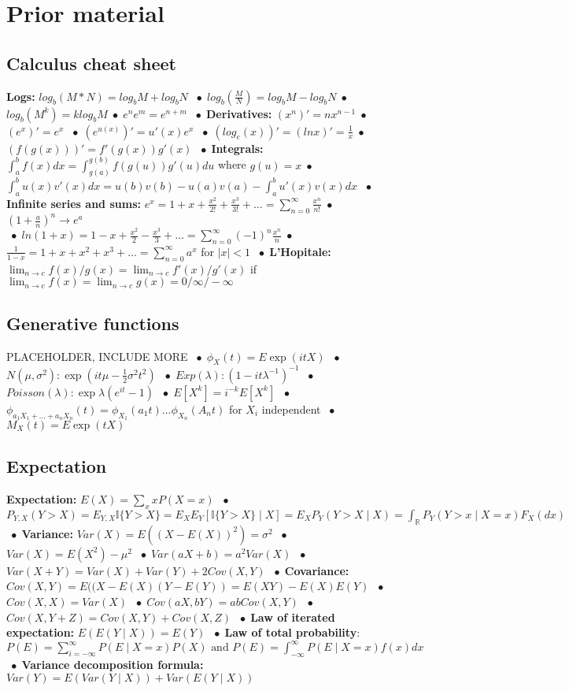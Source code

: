 \documentclass[9pt]{extarticle}
\newcommand{\abs}[1]{\lvert#1\rvert}
\newcommand*\bspace{$\; \bullet \;$}
\begin{document}
\section{Prior material}
\subsection{Calculus cheat sheet}
\textbf{Logs:} $log_b(M * N) = log_bM + log_bN$ \bspace $log_b(\frac{M}{N}) = log_bM - log_bN$\bspace $log_b(M^k) = klog_bM$\bspace $e^ne^m = e^{n+m}$ \bspace \textbf{Derivatives:} $(x^n)' = nx^{n-1}$\bspace $(e^x)' = e^x$ \bspace $(e^{u(x)})' = u'(x)e^x$ \bspace $(log_e(x))' = (lnx)' = \frac{1}{x}$\bspace $(f(g(x)))' = f'(g(x))g'(x)$ \bspace \textbf{Integrals: } $\int_a^b f(x)dx = \int_{g(a)}^{g(b)}f(g(u))g'(u)du$ where $g(u) = x$\bspace $\int_a^b u(x)v'(x)dx = u(b)v(b) - u(a)v(a) - \int_a^b u'(x)v(x)dx$ \bspace \textbf{Infinite series and sums:} $e^x = 1 + x + \frac{x^2}{2!} + \frac{x^3}{3!} + \dots = \sum_{n=0}^\infty \frac{x^n}{n!}$\bspace $(1 + \frac{a}{n})^n \longrightarrow e^a$\\
\bspace $ln(1 + x) = 1 - x + \frac{x^2}{2} - \frac{x^3}{3} + \dots = \sum_{n=0}^\infty (-1)^n\frac{x^n}{n}$\bspace $\frac{1}{1-x} = 1 + x + x^2 + x^3 + \dots = \sum_{n=0}^\infty a^x$ for $\abs{x} < 1$ \bspace \textbf{L'Hopitale:} $\lim_{n\rightarrow c} f(x) / g(x) = \lim_{n\rightarrow c} f'(x)/g'(x)$ if $\lim_{n\rightarrow c} f(x) = \lim_{n\rightarrow c} g(x) = 0/\infty/-\infty$
\subsection{Generative functions}
PLACEHOLDER, INCLUDE MORE
\bspace $\phi_X(t) = E \exp(itX)$ \bspace $N(\mu, \sigma^2): \exp(it\mu - \frac{1}{2}\sigma^2t^2)$ \bspace $Exp(\lambda): (1 - it\lambda ^{-1})^{-1}$ \bspace $Poisson(\lambda): \exp{\lambda(e^{it} - 1)}$ \bspace $E[X^k] = i^{-k}E[X^k]$ \bspace $\phi_{a_1X_1 + \dots + a_nX_n}(t) = \phi_{X_1}(a_1t) \dots \phi_{X_n}(A_nt)$ for $X_i$ independent \bspace $M_X(t) = E\exp(tX)$


\subsection{Expectation}
\textbf{Expectation:} $E(X) = \sum_x xP(X=x)$ \bspace $P_{Y,X}(Y > X) = E_{Y,X}\mathbb{I}\{Y>X\} = E_XE_Y[\mathbb{I}\{Y>X\} \mid X] = E_XP_Y(Y > X \mid X) = \int_\mathbb{R}P_Y(Y > x \mid X = x)F_X(dx)$ \bspace \textbf{Variance: } $Var(X) = E((X - E(X))^2) = \sigma^2$ \bspace $Var(X) = E(X^2) - \mu^2$ \bspace $Var(aX+b) = a^2Var(X)$ \bspace $Var(X + Y) = Var(X) + Var(Y) + 2Cov(X, Y)$ \bspace \textbf{Covariance: } $Cov(X, Y) = E((X - E(X)(Y - E(Y)) = E(XY) - E(X)E(Y)$ \bspace $Cov(X, X) = Var(X)$ \bspace $Cov(aX, bY) = abCov(X, Y)$ \bspace $Cov(X, Y+Z) = Cov(X, Y) + Cov(X, Z)$ \bspace \textbf{Law of iterated expectation: } $E(E(Y\mid X)) = E(Y)$ \bspace \textbf{Law of total probability}: $P(E) = \sum_{i=-\infty}^\infty P(E \mid X = x)P(X) \textrm{ and } P(E) = \int_{-\infty}^\infty P(E \mid X=x)f(x)dx$ \bspace \textbf{Variance decomposition formula: } $Var(Y) = E(Var(Y\mid X)) + Var(E(Y \mid X))$
 
\end{document}
